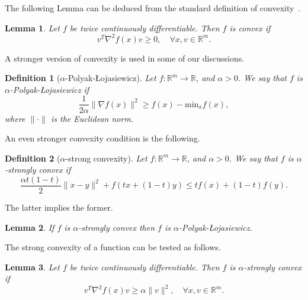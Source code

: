 \documentclass[
    reprint,
    aps,
    prx,
    longbibliography
]{revtex4-2}
\newtheorem{lemma}{Lemma}
\newtheorem{definition}{Definition}
\begin{document}
The following Lemma can be deduced from the standard definition of convexity~\cite{Garrigos2023}. 

\begin{lemma}
\label{lem:convexity}
Let $f$ be twice continuously differentiable. Then $f$ is convex if 
\begin{equation}
\label{eq:convex} 
    v^T \nabla^2 f(x) v \geq 0, \quad \forall x,v \in \mathbb{R}^m . 
\end{equation}
\end{lemma} 

A stronger version of convexity is used in some of our discussions.

\begin{definition}[$\alpha$-Polyak-{\L}ojasiewicz]
\label{def:PL}
Let $f : \mathbb{R}^m \rightarrow \mathbb{R}$, and $\alpha > 0$. We say that $f$ is $\alpha$-Polyak-{\L}ojasiewicz if 
\begin{equation}
\frac{1}{2\alpha}\|\nabla f(x)\|^2 \geq f(x) - \mathrm{min}_x f(x),
\end{equation} 
where $\| \cdot \|$ is the Euclidean norm.
\end{definition}

An even stronger convexity condition is the following.

\begin{definition}[$\alpha$-strong convexity]
Let $f : \mathbb{R}^m \rightarrow \mathbb{R}$, and $\alpha > 0$. We say that $f$ is $\alpha$-strongly convex if
\begin{equation}
    \frac{ \alpha t(1-t) } {2} \| x - y \| ^2 
+ f(tx + (1-t)y) \leq tf (x) + (1-t)f(y).
\end{equation} 
\end{definition}

The latter implies the former.

\begin{lemma}
\label{lem:PL}
If $f$ is $\alpha$-strongly convex then $f$ is $\alpha$-Polyak-{\L}ojasiewicz.
\end{lemma}

The strong convexity of a function can be tested as follows.

\begin{lemma}
\label{lem:strong_convexity}
Let $f$ be twice continuously differentiable. Then $f$ is $\alpha$-strongly convex if 
\begin{equation}
    v^T \nabla^2 f(x) v \geq \alpha \| v \|^2, \quad \forall x,v \in \mathbb{R}^m .
\end{equation}
\end{lemma}
\end{document}
